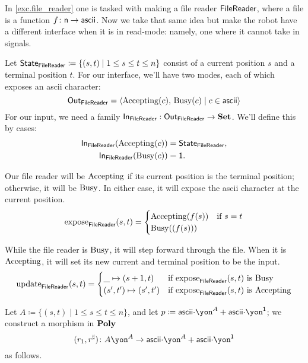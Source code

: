 \documentclass[DynamicalBook]{subfiles}
\begin{document}
\begin{example}\label{ex.generalized_file_reader}
In \cref{exc.file_reader} one is tasked with making a file reader $\mathsf{FileReader}$, where a file is a function $f\colon\mathsf{n}\to\mathsf{ascii}$. Now we take that same idea but make the robot have a different interface when it is in read-mode: namely, one where it cannot take in signals.

Let $\mathsf{State}_{\mathsf{FileReader}} \coloneqq \{(s,t)\mid 1\leq s\leq t\leq n\}$ consist of a
current position $s$ and a terminal position $t$. For our interface, we'll have
two modes, each of which exposes an ascii character:
\[\mathsf{Out}_{\mathsf{FileReader}} = \langle \mathrm{Accepting}(c),\, \mathrm{Busy}(c) \mid c \in \mathsf{ascii} \rangle
\]
For our input, we need a family $\mathsf{In}_{\mathsf{FileReader}} : \mathsf{Out}_{\mathsf{FileReader}} \to \textbf{Set}$.
We'll define this by cases:
\begin{align*}
  \mathsf{In}_{\mathsf{FileReader}}(\mathrm{Accepting}(c)) &= \mathsf{State}_{\mathsf{FileReader}}, \\
  \mathsf{In}_{\mathsf{FileReader}}(\mathrm{Busy}(c)) &= \mathsf{1}.
\end{align*}

Our file reader will be $\mathrm{Accepting}$ if its current position is the
terminal position; otherwise, it will be $\mathrm{Busy}$. In either case, it will
expose the ascii character at the current position.
\begin{align*}
  \mathrm{expose}_{\mathsf{FileReader}}(s, t) = \begin{cases} \mathrm{Accepting}(f(s)) &\mbox{if $s = t$}\\ \mathrm{Busy}((f(s)))  \end{cases}
\end{align*}

While the file reader is $\mathrm{Busy}$, it will step forward through the file.
When it is $\mathrm{Accepting}$, it will set its new current and terminal position
to be the input. 
\begin{align*}
  \mathrm{update}_{\mathsf{FileReader}}(s, t) = \begin{cases} \_ \mapsto (s + 1, t) &\mbox{if $\mathrm{expose}_{\mathsf{FileReader}}(s, t)$ is $\mathrm{Busy}$} \\ (s', t') \mapsto (s', t') &\mbox{if $\mathrm{expose}_{\mathsf{FileReader}}(s, t)$ is $\mathrm{Accepting}$}  \end{cases}
\end{align*}

Let $A\coloneqq\{(s,t)\mid 1\leq s\leq t\leq n\}$, and let $p\coloneqq \Set{ascii}\mdot\yon^A+\Set{ascii}\mdot\yon^\1$; we construct a morphism in $\textbf{Poly}$
\[
(r_1,r^\sharp)\colon A\yon^A\to \Set{ascii}\mdot\yon^A+\Set{ascii}\mdot\yon^\1
\]
as follows.


\end{example}
\end{document}
